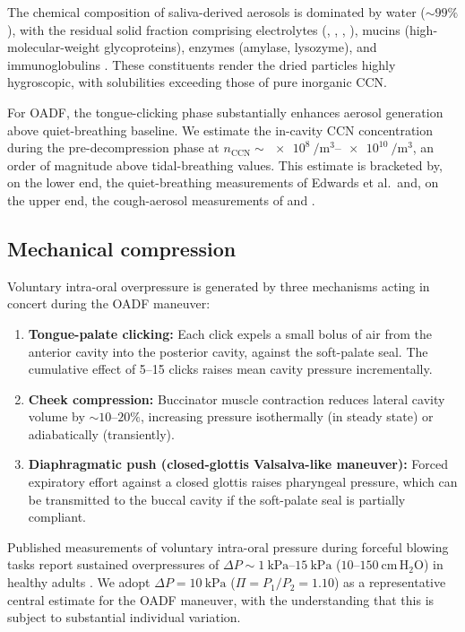 \documentclass[11pt,a4paper]{article}
\theoremstyle{definition}
\theoremstyle{plain}
\begin{document}
The chemical composition of saliva-derived aerosols is dominated by water ($\sim\!99\%$), with the residual solid fraction comprising electrolytes (, , , ), mucins (high-molecular-weight glycoproteins), enzymes (amylase, lysozyme), and immunoglobulins \citep{Humphrey2001}. These constituents render the dried particles highly hygroscopic, with solubilities exceeding those of pure inorganic CCN.

For OADF, the tongue-clicking phase substantially enhances aerosol generation above quiet-breathing baseline. We estimate the in-cavity CCN concentration during the pre-decompression phase at $n_{\text{CCN}} \sim \SIrange{e8}{e10}{\per\cubic\meter}$, an order of magnitude above tidal-breathing values. This estimate is bracketed by, on the lower end, the quiet-breathing measurements of Edwards et al.\ and, on the upper end, the cough-aerosol measurements of \citet{Yang2007} and \citet{Lindsley2010}.

\subsection{Mechanical compression}
\label{sec:compression}

Voluntary intra-oral overpressure is generated by three mechanisms acting in concert during the OADF maneuver:
\begin{enumerate}
  \item \textbf{Tongue-palate clicking:} Each click expels a small bolus of air from the anterior cavity into the posterior cavity, against the soft-palate seal. The cumulative effect of 5–15 clicks raises mean cavity pressure incrementally.
  \item \textbf{Cheek compression:} Buccinator muscle contraction reduces lateral cavity volume by $\sim\!10\text{--}20\%$, increasing pressure isothermally (in steady state) or adiabatically (transiently).
  \item \textbf{Diaphragmatic push (closed-glottis Valsalva-like maneuver):} Forced expiratory effort against a closed glottis raises pharyngeal pressure, which can be transmitted to the buccal cavity if the soft-palate seal is partially compliant.
\end{enumerate}
Published measurements of voluntary intra-oral pressure during forceful blowing tasks report sustained overpressures of $\Delta P \sim \SIrange{1}{15}{\kilo\pascal}$ ($10\text{--}150~\mathrm{cm\,H_2O}$) in healthy adults \citep{Netsell1976,Hixon1988}. We adopt $\Delta P = \SI{10}{\kilo\pascal}$ ($\Pi = P_1/P_2 = 1.10$) as a representative central estimate for the OADF maneuver, with the understanding that this is subject to substantial individual variation.
\end{document}
